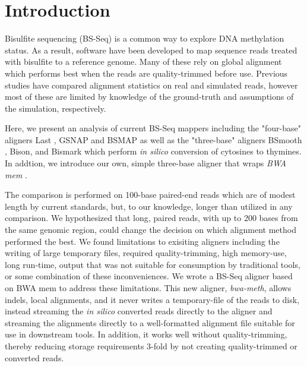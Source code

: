\documentclass{bioinfo}
\begin{document}
\section{Introduction}
Bisulfite sequencing (BS-Seq) is a common way to explore DNA methylation status.
As a result, software \citep{frithlast,methylcoder,gsnap,krueger2011,bsmap,bsmooth}
have been developed to map sequence reads treated with bisulfite to a reference genome.
Many of these rely on global alignment which performs best when the reads are quality-trimmed
before use. Previous studies have compared alignment statistics on 
real \citep{methylcoder,bsmap,shrestha} and simulated \citep{frithlast} reads,
however most of these are limited by knowledge of the ground-truth and assumptions of
the simulation, respectively.

Here, we present an analysis of current BS-Seq mappers including the "four-base" aligners
Last \citep{frithlast}, GSNAP \citep{gsnap} and BSMAP \citep{bsmap} as well as the
"three-base" aligners BSmooth \citep{bsmooth}, Bison, and Bismark \citep{krueger2011} which
perform \emph{in silico} conversion of cytosines to thymines. In addtion, we introduce our
own, simple three-base aligner that wraps \textit{BWA mem} \citep{bwamem}.

The comparison is performed on 100-base paired-end reads
which are of modest length by current standards, but, to our knowledge, longer than
utilized in any comparison. We hypothesized that long, paired reads, with up
to 200 bases from the same genomic region, could change the decision on which
alignment method performed the best. 
We found limitations to exisiting aligners including the writing of large temporary
files, required quality-trimming, high memory-use, long run-time, output that was not
suitable for consumption by traditional tools, or some combination of these
inconveniences. We wrote
a BS-Seq aligner based on BWA mem \citep{bwamem} to address these
limitations. This new aligner, 
\textit{bwa-meth}, allows indels, local alignments, and it never writes a
temporary-file of the reads to disk, instead streaming the \emph{in silico} converted
reads directly to the aligner and streaming the alignments directly to a well-formatted
alignment file suitable for use in downstream tools. In addition, it works well without
quality-trimming, thereby reducing storage requirements 3-fold by not creating
quality-trimmed or converted reads.
\end{document}
